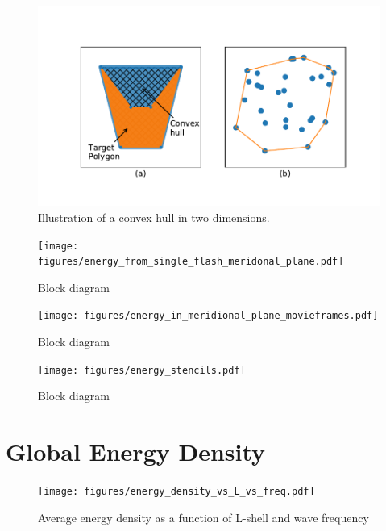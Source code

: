 \begin{figure}
\begin{center}
\includegraphics{figures/convex_hulls.pdf}
\caption{Illustration of a convex hull in two dimensions.}
\label{fig:convex_hulls}
\end{center}
\end{figure}



\begin{figure}
\begin{center}
\texttt{[image: figures/energy\_from\_single\_flash\_meridonal\_plane.pdf]}
\caption{Block diagram}
\label{fig:energy_from_single_flash}
\end{center}
\end{figure}


\begin{figure}
\begin{center}
\texttt{[image: figures/energy\_in\_meridional\_plane\_movieframes.pdf]}
\caption{Block diagram}
\label{fig:energy_from_single_flash}
\end{center}
\end{figure}


\begin{figure}[ht]
\begin{center}
\texttt{[image: figures/energy\_stencils.pdf]}
\caption{Block diagram}
\label{fig:energy_stencils}
\end{center}
\end{figure}

\section{Global Energy Density}

\begin{figure}
\begin{center}
\texttt{[image: figures/energy\_density\_vs\_L\_vs\_freq.pdf]}
\caption[Average energy density vs L and frequency]{Average energy density as a function of L-shell and wave frequency}
\label{fig:energy_density_vs_L_vs_freq}
\end{center}
\end{figure}
